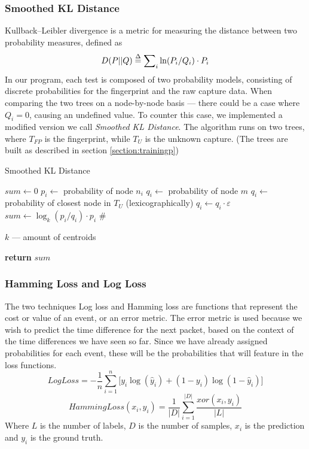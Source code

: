 \documentclass[9pt,journal,compsoc]{IEEEtran}
\newcommand\LONGCOMMENT[1]{%
  \hfill\#\ \begin{minipage}[t]{\eqboxwidth{COMMENT}}#1\strut\end{minipage}%
}
\begin{document}
\subsubsection{Smoothed KL Distance}
Kullback–Leibler divergence is a metric for measuring the distance between two probability measures, defined as 
\begin{equation}\label{eq:kld}
D(P||Q) \buildrel \Delta \over = \sum\nolimits_i {\ln ({P_i}/{Q_i}) \cdot {P_i}}
\end{equation}
In our program, each test is composed of two probability models, consisting of discrete probabilities for the fingerprint and the raw capture data. When comparing the two trees on a node-by-node basis --- there could be a case where $Q_i=0$, causing an undefined value.
To counter this case, we implemented a modified version we call \emph{Smoothed KL Distance}.
The algorithm runs on two trees, where $T_{FP}$ is the fingerprint, while $T_U$ is the unknown capture.
(The trees are built as described in section \ref{section:trainingp})
\begin{algorithm}
\caption{Smoothed KL Distance}\label{kld}
\begin{algorithmic}[1]
\State $sum\gets0$
      \State $p_i\gets$ probability of node $n_i$
      	\State $q_i\gets$ probability of node $m$
      \Else
      	\State $q_i\gets$ probability of closest node in $T_U$ (lexicographically)
      	\State $q_i\gets q_i\cdot\varepsilon$
      \EndIf
   \State$sum\gets
   \log_k (p_i/q_i) \cdot {p_i}$\LONGCOMMENT{$k$ --- amount of centroids}
   \EndFor\label{euclidendwhile}
   \State \textbf{return} $sum$
\EndProcedure
\end{algorithmic}
\end{algorithm}
\subsubsection{Hamming Loss and Log Loss}
The two techniques Log loss \cite{Bis06} and Hamming loss  \cite{Tso07, Ham50} are functions that represent the cost or value of an event, or an error metric.
The error metric is used because we wish to predict the time difference for the next packet, based on the context of the time differences we have seen so far.
Since we have already assigned probabilities for each event, these will be the probabilities that will feature in the loss functions.
\begin{equation}\label{eq:ll}
LogLoss =  - \frac{1}{n}\sum\limits_{i = 1}^n {[{y_i}\log ({{\hat y}_i}) + (1 - {y_i})\log } (1 - {\hat y_i})]
\end{equation}
\begin{equation}\label{eq:hl}
HammingLoss({x_i},{y_i}) = \frac{1}{{\left| D \right|}}\sum\limits_{i = 1}^{\left| D \right|} {\frac{{xor({x_i},{y_i})}}{{\left| L \right|}}}
\end{equation}
Where $L$ is the number of labels, $D$ is the number of samples, $x_i$ is the prediction and $y_i$ is the ground truth.
\end{document}

